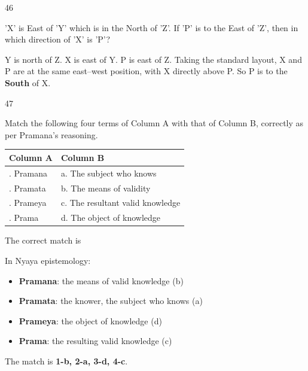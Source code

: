 \begin{question}{46}
{'X' is East of 'Y' which is in the North of 'Z'. If 'P' is to the East of 'Z', then in which direction of 'X' is 'P'?\par}
\begin{explain}
\begin{center}
\end{center}
Y is north of Z. X is east of Y. P is east of Z. Taking the standard layout, X and P are at the same east--west position, with X directly above P. So P is to the \textbf{South} of X.
\end{explain}
\end{question}

\begin{question}{47}
{Match the following four terms of Column A with that of Column B, correctly as per Pramana's reasoning.\par\smallskip\begin{tabularx}{\linewidth}{@{}>{\raggedright\arraybackslash}X>{\raggedright\arraybackslash}X@{}}\toprule
\textbf{Column A} & \textbf{Column B}\\\midrule
1. Pramana & a. The subject who knows\\
2. Pramata & b. The means of validity\\
3. Prameya & c. The resultant valid knowledge\\
4. Prama & d. The object of knowledge\\
\bottomrule\end{tabularx}\par\smallskip
The correct match is\par}
\begin{explain}
In Nyaya epistemology:
\begin{itemize}
\item \textbf{Pramana}: the means of valid knowledge (b)
\item \textbf{Pramata}: the knower, the subject who knows (a)
\item \textbf{Prameya}: the object of knowledge (d)
\item \textbf{Prama}: the resulting valid knowledge (c)
\end{itemize}
The match is \textbf{1-b, 2-a, 3-d, 4-c}.
\end{explain}
\end{question}

